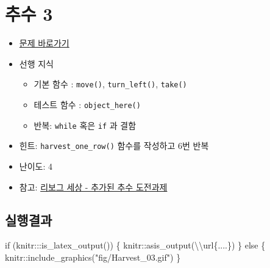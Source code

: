 \documentclass[
  b5paperpaper,
  DIV=11,
  numbers=noendperiod]{scrreprt}
\newenvironment{Shaded}{\begin{snugshade}}{\end{snugshade}}
\newcommand{\ControlFlowTok}[1]{\textcolor[rgb]{0.00,0.23,0.31}{#1}}
\newcommand{\FunctionTok}[1]{\textcolor[rgb]{0.28,0.35,0.67}{#1}}
\newcommand{\NormalTok}[1]{\textcolor[rgb]{0.00,0.23,0.31}{#1}}
\newcommand{\SpecialCharTok}[1]{\textcolor[rgb]{0.37,0.37,0.37}{#1}}
\newcommand{\StringTok}[1]{\textcolor[rgb]{0.13,0.47,0.30}{#1}}
\providecommand{\tightlist}{%
  \setlength{\itemsep}{0pt}\setlength{\parskip}{0pt}}\usepackage{longtable,booktabs,array}
\begin{document}
\hypertarget{harvest-03}{%
\section{추수 3}\label{harvest-03}}

\begin{itemize}
\tightlist
\item
  \href{https://reeborg.ca/reeborg.html?lang=ko-en\&mode=python\&menu=worlds\%2Fmenus\%2Freeborg_intro_en.json\&name=Harvest\%203\&url=worlds\%2Ftutorial_en\%2Fharvest3.json}{문제
  바로가기}
\item
  선행 지식

  \begin{itemize}
  \tightlist
  \item
    기본 함수 : \texttt{move()}, \texttt{turn\_left()}, \texttt{take()}
  \item
    테스트 함수 : \texttt{object\_here()}
  \item
    반복: \texttt{while} 혹은 \texttt{if} 과 결함
  \end{itemize}
\item
  힌트: \texttt{harvest\_one\_row()} 함수를 작성하고 6번 반복
\item
  난이도: 4
\item
  참고: \href{https://reeborg.ca/docs/ko/variables/harvest3.html}{리보그
  세상 - 추가된 추수 도전과제}
\end{itemize}

\hypertarget{uxc2e4uxd589uxacb0uxacfc-27}{%
\subsection{실행결과}\label{uxc2e4uxd589uxacb0uxacfc-27}}

\begin{Shaded}
\begin{Highlighting}[]
\ControlFlowTok{if}\NormalTok{ (knitr}\SpecialCharTok{:::}\FunctionTok{is\_latex\_output}\NormalTok{()) \{}
\NormalTok{  knitr}\SpecialCharTok{::}\FunctionTok{asis\_output}\NormalTok{(}\StringTok{\textquotesingle{}}\SpecialCharTok{\textbackslash{}\textbackslash{}}\StringTok{url\{....\}\textquotesingle{}}\NormalTok{)}
\NormalTok{\} }\ControlFlowTok{else}\NormalTok{ \{}
\NormalTok{  knitr}\SpecialCharTok{::}\FunctionTok{include\_graphics}\NormalTok{(}\StringTok{"fig/Harvest\_03.gif"}\NormalTok{)}
\NormalTok{\}}
\end{Highlighting}
\end{Shaded}
\end{document}
